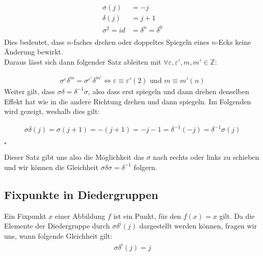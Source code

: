 \documentclass[12pt, german]{article}
\newcommand{\bewiesen}{
	
	\begin{flushright}
		$\square$  \\
\end{flushright}}
\begin{document}
	\begin{align*}
		\sigma(j)&=-j\\
		\delta(j)&=j+1\\
		\sigma^2 = id &= \delta^n = \delta^0 \\ 	 
	\end{align*}
	Dies bedeutet, dass $n$-faches drehen oder doppeltes Spiegeln eines  $n$-Ecks keine Änderung bewirkt.  \\
	Daraus lässt sich dann folgender Satz ableiten mit $\forall \varepsilon, \varepsilon', m, m' \in \mathbb{Z}$: 
	
	\begin{align*}
		\sigma^\varepsilon\delta^m = \sigma^{\varepsilon'}\delta^{m'} \iff \varepsilon \equiv \varepsilon' (2) \text{ und } m \equiv m' (n)
	\end{align*}
	Weiter gilt, dass $\sigma\delta = \delta^{-1}\sigma$, also dass erst spiegeln und dann drehen denselben Effekt hat wie in die andere Richtung drehen und dann spiegeln. Im Folgenden wird gezeigt, weshalb dies gilt:
	
	\begin{align*}
		\sigma \delta(j) = \sigma(j+1) = -(j + 1) = -j -1 = \delta^{-1}(-j)=\delta^{-1}\sigma(j)
	\end{align*}
	\bewiesen
	Dieser Satz gibt uns also die Möglichkeit das $\sigma$ nach rechts oder links zu schieben und wir können die Gleichheit $\sigma\delta\sigma = \delta^{-1}$ folgern.
	
	\subsection{Fixpunkte in Diedergruppen}
	Ein Fixpunkt $x$ einer Abbildung $f$ ist ein Punkt, für den $f(x) = x$ gilt. Da die Elemente der Diedergruppe durch $\sigma\delta^i(j)$ dargestellt werden können, fragen wir uns, wann folgende Gleichheit gilt:
	\begin{align*}
		\sigma\delta^i(j) = j
	\end{align*} 
	
\end{document}
